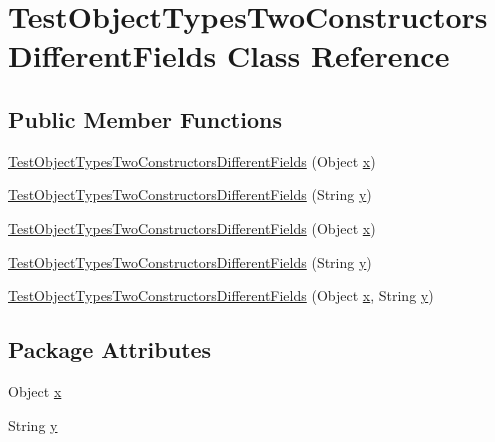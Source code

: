 \hypertarget{classTestObjectTypesTwoConstructorsDifferentFields}{
\section{TestObjectTypesTwoConstructorsDifferentFields Class Reference}
\label{classTestObjectTypesTwoConstructorsDifferentFields}
}
\subsection*{Public Member Functions}
\begin{DoxyCompactItemize}
\item 
\hyperlink{classTestObjectTypesTwoConstructorsDifferentFields_a69ac975d935d3963d423a13cf5a6b0b2}{TestObjectTypesTwoConstructorsDifferentFields} (Object \hyperlink{classTestObjectTypesTwoConstructorsDifferentFields_a1716f13523a6574dd4f90cd7c513ec7a}{x})
\item 
\hyperlink{classTestObjectTypesTwoConstructorsDifferentFields_afd7520cd43e74e1885925f42d64ea0e9}{TestObjectTypesTwoConstructorsDifferentFields} (String \hyperlink{classTestObjectTypesTwoConstructorsDifferentFields_a094ae97fd8261ada6d7105ec74f157ad}{y})
\item 
\hyperlink{classTestObjectTypesTwoConstructorsDifferentFields_a69ac975d935d3963d423a13cf5a6b0b2}{TestObjectTypesTwoConstructorsDifferentFields} (Object \hyperlink{classTestObjectTypesTwoConstructorsDifferentFields_a1716f13523a6574dd4f90cd7c513ec7a}{x})
\item 
\hyperlink{classTestObjectTypesTwoConstructorsDifferentFields_afd7520cd43e74e1885925f42d64ea0e9}{TestObjectTypesTwoConstructorsDifferentFields} (String \hyperlink{classTestObjectTypesTwoConstructorsDifferentFields_a094ae97fd8261ada6d7105ec74f157ad}{y})
\item 
\hyperlink{classTestObjectTypesTwoConstructorsDifferentFields_a34bc84639559e73b1aeaac62efe576a0}{TestObjectTypesTwoConstructorsDifferentFields} (Object \hyperlink{classTestObjectTypesTwoConstructorsDifferentFields_a1716f13523a6574dd4f90cd7c513ec7a}{x}, String \hyperlink{classTestObjectTypesTwoConstructorsDifferentFields_a094ae97fd8261ada6d7105ec74f157ad}{y})
\end{DoxyCompactItemize}
\subsection*{Package Attributes}
\begin{DoxyCompactItemize}
\item 
Object \hyperlink{classTestObjectTypesTwoConstructorsDifferentFields_a1716f13523a6574dd4f90cd7c513ec7a}{x}
\item 
String \hyperlink{classTestObjectTypesTwoConstructorsDifferentFields_a094ae97fd8261ada6d7105ec74f157ad}{y}
\end{DoxyCompactItemize}


